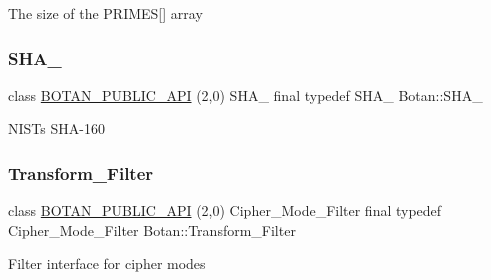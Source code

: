 The size of the P\+R\+I\+M\+ES\mbox{[}\mbox{]} array \mbox{\label{namespace_botan_a7aedf36a60e3180255517925fa25efca}} 
\subsubsection{\texorpdfstring{S\+H\+A\+\_}{SHA\_1}}
{\footnotesize\ttfamily class \hyperlink{namespace_botan_a6b9388030d872e586a4655b776ac9501}{B\+O\+T\+A\+N\+\_\+\+P\+U\+B\+L\+I\+C\+\_\+\+A\+PI} (2,0) S\+H\+A\+\_ final typedef S\+H\+A\+\_ Botan\+::\+S\+H\+A\+\_}

N\+I\+ST\textquotesingle{}s S\+H\+A-\/160 \mbox{\label{namespace_botan_a021ffc520728602cd2f027a40b68bc5f}} 
\subsubsection{\texorpdfstring{Transform\+\_\+\+Filter}{Transform\_Filter}}
{\footnotesize\ttfamily class \hyperlink{namespace_botan_a6b9388030d872e586a4655b776ac9501}{B\+O\+T\+A\+N\+\_\+\+P\+U\+B\+L\+I\+C\+\_\+\+A\+PI} (2,0) Cipher\+\_\+\+Mode\+\_\+\+Filter final typedef Cipher\+\_\+\+Mode\+\_\+\+Filter Botan\+::\+Transform\+\_\+\+Filter}

Filter interface for cipher modes 